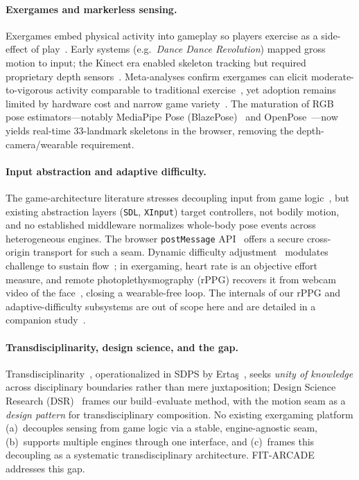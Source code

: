\documentclass[runningheads]{llncs}
\newcommand{\sys}{\textsc{FIT-ARCADE}}
\newcommand{\postmsg}{\texttt{postMessage}}
\newcommand{\citecompanion}{\cite{companion2026}}
\begin{document}
\paragraph{Exergames and markerless sensing.}
Exergames embed physical activity into gameplay so players exercise as a
side-effect of play~\cite{oh2017systematic,mueller2011exertion}. Early systems
(e.g.\ \emph{Dance Dance Revolution}) mapped gross motion to input; the Kinect
era enabled skeleton tracking but required proprietary depth
sensors~\cite{chang2012kinectfit,gao2015kinect}. Meta-analyses confirm exergames
can elicit moderate-to-vigorous activity comparable to traditional
exercise~\cite{peng2013healthgames}, yet adoption remains limited by hardware
cost and narrow game variety~\cite{sinclair2007considerations}. The maturation
of RGB pose estimators---notably MediaPipe Pose (BlazePose)~\cite{bazarevsky2020blazepose,mediapipe2023}
and OpenPose~\cite{cao2017openpose}---now yields real-time 33-landmark skeletons
in the browser, removing the depth-camera/wearable requirement.

\paragraph{Input abstraction and adaptive difficulty.}
The game-architecture literature stresses decoupling input from game
logic~\cite{nystrom2014game,gregory2018game}, but existing abstraction layers
(\texttt{SDL}, \texttt{XInput}) target controllers, not bodily motion, and no
established middleware normalizes whole-body pose events across heterogeneous
engines. The browser \postmsg{} API~\cite{html5postmessage} offers a secure
cross-origin transport for such a seam. Dynamic difficulty
adjustment~\cite{hunicke2005dda} modulates challenge to sustain
flow~\cite{csikszentmihalyi1990flow,sweetser2005gameflow}; in exergaming,
heart rate is an objective effort measure, and remote photoplethysmography
(rPPG) recovers it from webcam video of the face~\cite{wang2017pos}, closing a
wearable-free loop. The internals of our rPPG and adaptive-difficulty subsystems
are out of scope here and are detailed in a companion study~\citecompanion{}.

\paragraph{Transdisciplinarity, design science, and the gap.}
Transdisciplinarity~\cite{nicolescu2002manifesto}, operationalized in SDPS by
Erta\c{s}~\cite{ertas2010transdisciplinary,ertas2018role}, seeks \emph{unity of
knowledge} across disciplinary boundaries rather than mere juxtaposition; Design
Science Research (DSR)~\cite{hevner2004dsr,peffers2007dsrm} frames our
build--evaluate method, with the motion seam as a \emph{design pattern} for
transdisciplinary composition. No existing exergaming platform (a)~decouples
sensing from game logic via a stable, engine-agnostic seam, (b)~supports multiple
engines through one interface, and (c)~frames this decoupling as a systematic
transdisciplinary architecture. \sys{} addresses this gap.
\end{document}
